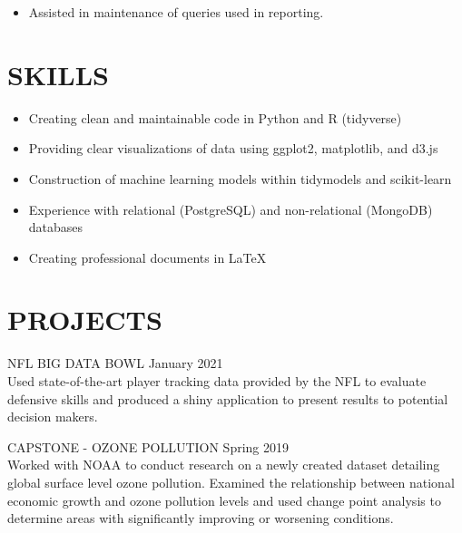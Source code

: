 \documentclass[11pt]{res} %
\begin{document}
\begin{resume}
\begin{itemize} 
	\item Assisted in maintenance of queries used in reporting.
\end{itemize}

\vspace{-0.2in}
\hrulefill
\vspace{-0.2in}  
\section{SKILLS}

\begin{itemize} 
	\item Creating clean and maintainable code in Python and R (tidyverse)
	\item Providing clear visualizations of data using ggplot2, matplotlib, and d3.js
	\item Construction of machine learning models within tidymodels and scikit-learn
	\item Experience with relational (PostgreSQL) and non-relational (MongoDB) databases
	\item Creating professional documents in \LaTeX
\end{itemize}

\vspace{-0.2in}
\hrulefill
\vspace{-0.2in}  

\section{PROJECTS}
\begin{hangparas}{.25in}{1}
NFL BIG DATA BOWL \hfill January 2021 \\
Used state-of-the-art player tracking data provided by the NFL to evaluate defensive skills and produced a shiny application to present results to potential decision makers.
	\vspace{-0.15in}  
	
CAPSTONE - OZONE POLLUTION \hfill Spring 2019	\\
Worked with NOAA to conduct research on a newly created dataset detailing global surface level ozone pollution. Examined the relationship between national economic growth and ozone pollution levels and used change point analysis to determine areas with significantly improving or worsening conditions.
\vspace{-0.15in}  

\end{hangparas}
\end{resume}
\end{document}
